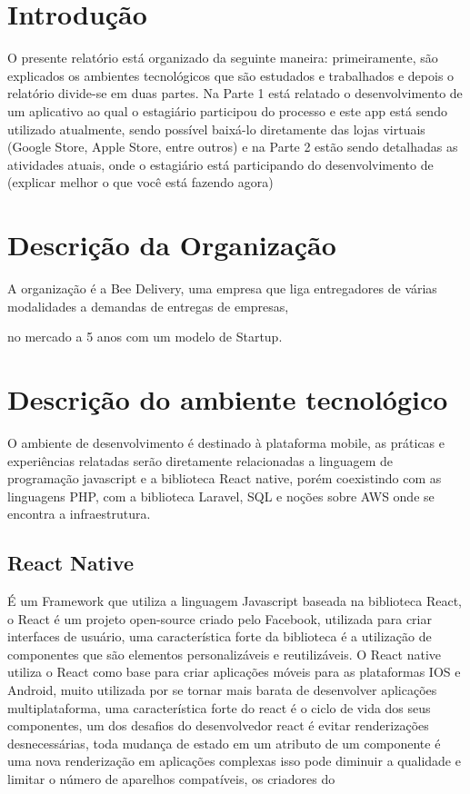 \documentclass{ufersa}
\begin{document}
\section{Introdução}

O presente relatório está organizado da seguinte maneira: primeiramente, são explicados os ambientes tecnológicos que são estudados e trabalhados e depois o relatório divide-se em duas partes. Na Parte 1 está relatado o desenvolvimento de um aplicativo ao qual o estagiário participou do processo e este app está sendo utilizado atualmente, sendo possível baixá-lo diretamente das lojas virtuais (Google Store, Apple Store, entre outros) e na Parte 2 estão sendo detalhadas as atividades atuais, onde o estagiário está participando do desenvolvimento de (explicar melhor o que você está fazendo agora)

\section{Descrição da Organização}

A organização é a Bee Delivery, uma empresa que liga entregadores de várias modalidades a demandas de entregas de empresas, 

no mercado a 5 anos com um modelo de Startup.

\section{Descrição do ambiente tecnológico}

O ambiente de desenvolvimento é destinado à plataforma mobile, as práticas e experiências relatadas serão diretamente relacionadas a linguagem de programação javascript e a biblioteca React native, porém coexistindo com as linguagens PHP, com a biblioteca Laravel, SQL e noções sobre AWS onde se encontra a infraestrutura.

\subsection{React Native}

É um Framework que utiliza a linguagem Javascript baseada na biblioteca React, o React é um projeto open-source criado pelo Facebook, utilizada para criar interfaces de usuário, uma característica forte da biblioteca é a utilização de componentes que são elementos personalizáveis e reutilizáveis. O React native utiliza o React como base para criar aplicações móveis para as plataformas IOS e Android, muito utilizada por se tornar mais barata de desenvolver aplicações multiplataforma, uma característica forte do react é o ciclo de vida dos seus componentes, um dos desafios do desenvolvedor react é evitar renderizações desnecessárias, toda mudança de estado em um atributo de um componente é uma nova renderização em aplicações complexas isso pode diminuir a qualidade e limitar o número de aparelhos compatíveis, os criadores do 
\end{document}
